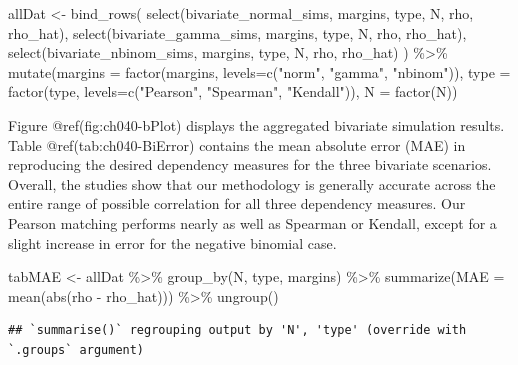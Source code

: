 \documentclass{article}
\newenvironment{Shaded}{\begin{snugshade}}{\end{snugshade}}
\newcommand{\AttributeTok}[1]{\textcolor[rgb]{0.77,0.63,0.00}{#1}}
\newcommand{\FunctionTok}[1]{\textcolor[rgb]{0.00,0.00,0.00}{#1}}
\newcommand{\NormalTok}[1]{#1}
\newcommand{\OtherTok}[1]{\textcolor[rgb]{0.56,0.35,0.01}{#1}}
\newcommand{\SpecialCharTok}[1]{\textcolor[rgb]{0.00,0.00,0.00}{#1}}
\newcommand{\StringTok}[1]{\textcolor[rgb]{0.31,0.60,0.02}{#1}}
\begin{document}
\begin{Shaded}
\begin{Highlighting}[]
\NormalTok{allDat }\OtherTok{\textless{}{-}} \FunctionTok{bind\_rows}\NormalTok{(}
    \FunctionTok{select}\NormalTok{(bivariate\_normal\_sims, margins, type, N, rho, rho\_hat),}
    \FunctionTok{select}\NormalTok{(bivariate\_gamma\_sims, margins, type, N, rho, rho\_hat),}
    \FunctionTok{select}\NormalTok{(bivariate\_nbinom\_sims, margins, type, N, rho, rho\_hat)}
\NormalTok{) }\SpecialCharTok{\%\textgreater{}\%}
    \FunctionTok{mutate}\NormalTok{(}\AttributeTok{margins =} \FunctionTok{factor}\NormalTok{(margins, }\AttributeTok{levels=}\FunctionTok{c}\NormalTok{(}\StringTok{"norm"}\NormalTok{, }\StringTok{"gamma"}\NormalTok{, }\StringTok{"nbinom"}\NormalTok{)),}
           \AttributeTok{type =} \FunctionTok{factor}\NormalTok{(type, }\AttributeTok{levels=}\FunctionTok{c}\NormalTok{(}\StringTok{"Pearson"}\NormalTok{, }\StringTok{"Spearman"}\NormalTok{, }\StringTok{"Kendall"}\NormalTok{)),}
           \AttributeTok{N =} \FunctionTok{factor}\NormalTok{(N))}
\end{Highlighting}
\end{Shaded}

Figure @ref(fig:ch040-bPlot) displays the aggregated bivariate
simulation results. Table @ref(tab:ch040-BiError) contains the mean
absolute error (MAE) in reproducing the desired dependency measures for
the three bivariate scenarios. Overall, the studies show that our
methodology is generally accurate across the entire range of possible
correlation for all three dependency measures. Our Pearson matching
performs nearly as well as Spearman or Kendall, except for a slight
increase in error for the negative binomial case.

\begin{Shaded}
\begin{Highlighting}[]
\NormalTok{tabMAE }\OtherTok{\textless{}{-}}\NormalTok{ allDat }\SpecialCharTok{\%\textgreater{}\%}
    \FunctionTok{group\_by}\NormalTok{(N, type, margins) }\SpecialCharTok{\%\textgreater{}\%}
    \FunctionTok{summarize}\NormalTok{(}\AttributeTok{MAE =} \FunctionTok{mean}\NormalTok{(}\FunctionTok{abs}\NormalTok{(rho }\SpecialCharTok{{-}}\NormalTok{ rho\_hat))) }\SpecialCharTok{\%\textgreater{}\%}
    \FunctionTok{ungroup}\NormalTok{()}
\end{Highlighting}
\end{Shaded}

\begin{verbatim}
## `summarise()` regrouping output by 'N', 'type' (override with `.groups` argument)
\end{verbatim}
\end{document}
